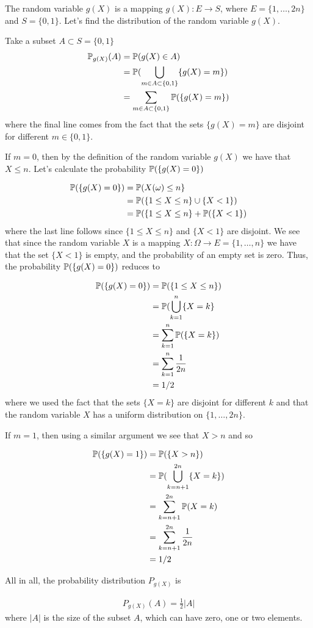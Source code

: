 
The random variable $ g(X)$ is a mapping $ g(X): E \to S$, where $ E = \{ 1,\dots, 2n \} $
and $ S = \{ 0,1 \} $. Let's find the distribution of the random variable $ g(X)$. 

Take a subset $ A \subset S = \{ 0,1 \} $
\begin{align*}
    \P_{g(X)} (A) &= \P(g(X) \in A) \\
		  &= \P(\bigcup_{m\in A \subset \{ 0,1 \} } \{ g(X) = m \} )\\
		  &= \sum_{m\in A \subset \{ 0,1 \} } \P( \{ g(X) = m \} )
\end{align*}
where the final line comes from the fact that the sets $ \{ g(X) = m \} $ are disjoint for different
$ m \in \{ 0,1 \} $. 

If $ m= 0$, then by the definition of the random variable $ g(X)$ we have that $ X \leq n$. 
Let's calculate the probability $ \P( \{ g(X) = 0 \}) $

\begin{align*}
    \P( \{ g(X) = 0 \} )&= \P( X(\omega) \leq n \}\\
			&= \P( \{1 \leq X \leq n\} \cup \{ X < 1 \} )\\
			&= \P( \{ 1 \leq X \leq n \} + \P( \{ X < 1 \} 	)
\end{align*}
where the last line follows since $ \{ 1 \leq X \leq n \} $ and $ \{ X <1 \} $ are disjoint. 
We see that since the random variable $ X$ is a mapping	$ X: \Omega \to E = \{ 1,\dots,n \} 
$ we have that the set $ \{ X < 1 \} $ is empty, and the probability of an empty set is zero.
Thus, the probability $ \P( \{ g(X) = 0 \} )$ reduces to

\begin{align*}
    \P( \{ g(X) = 0 \}) &= \P( \{ 1 \leq X \leq n \})\\
			&= \P( \bigcup_{k=1}^{n} \{ X = k \}\\
			&= \sum_{k=1}^{n} \P( \{ X = k \} ) \\
			&= \sum_{k=1}^{n} \frac{1}{2n} \\
			&= 1/2
\end{align*}
where we used the fact that the sets $ \{ X= k \} $ are disjoint for different $ k$ and that the
random variable $ X$ has a uniform distribution on $ \{ 1,\dots, 2n \} $.

If $ m = 1$, then using a similar argument we see that $ X > n$ and so 

\begin{align*}
    \P ( \{ g(X) = 1 \}	) &= \P( \{ X > n \} )\\
			  &= \P( \bigcup_{k=n+1}^{2n} \{ X= k \}    )\\
			  &= \sum_{k=n+1}^{2n} \P(X =k)\\
			  &= \sum_{k=n+1}^{2n} \frac{1}{2n}\\
			  &= 1/2
\end{align*}

All in all, the probability distribution $ P_{g(X)} $ is

\begin{align*}
    P_{g(X)} (A) = \frac{1}{2} |A|
\end{align*}
where $ |A| $ is the size of the subset $ A$, which can have zero, one or two elements.
